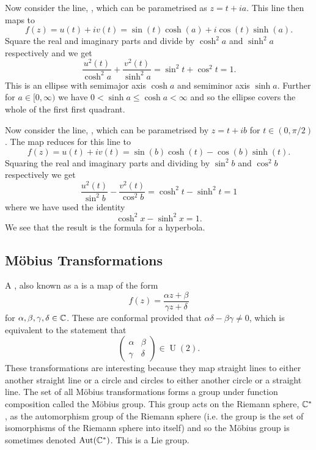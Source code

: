 \documentclass{article}
\begin{document}
    Now consider the line, , which can be parametrised as \(z = t + ia\).
    This line then maps to
    \[f(z) = u(t) + iv(t) = \sin(t)\cosh(a) + i \cos(t)\sinh(a).\]
    Square the real and imaginary parts and divide by \(\cosh^2 a\) and \(\sinh^2 a\) respectively and we get
    \[\frac{u^2(t)}{\cosh^2 a} + \frac{v^2(t)}{\sinh^2 a} = \sin^2 t + \cos^2 t = 1.\]
    This is an ellipse with semimajor axis \(\cosh a\) and semiminor axis \(\sinh a\).
    Further for \(a \in [0, \infty)\) we have \(0 < \sinh a \le \cosh a < \infty\) and so the ellipse covers the whole of the first first quadrant.
    
    Now consider the line, , which can be parametrised by \(z = t + ib\) for \(t \in (0, \pi/2)\).
    The map reduces for this line to
    \[f(z) = u(t) + iv(t) = \sin(b)\cosh(t) - \cos(b)\sinh(t).\]
    Squaring the real and imaginary parts and dividing by \(\sin^2 b\) and \(\cos^2 b\) respectively we get
    \[\frac{u^2(t)}{\sin^2 b} - \frac{v^2(t)}{\cos^2 b} = \cosh^2t - \sinh^2 t = 1\]
    where we have used the identity
    \[\cosh^2 x - \sinh^2 x = 1.\]
    We see that the result is the formula for a hyperbola.
    
    \subsection{M\"obius Transformations}
    A , also known as a  is a map of the form
    \[f(z) = \frac{\alpha z + \beta}{\gamma z + \delta}\]
    for \(\alpha, \beta, \gamma, \delta \in \mathbb{C}\).
    These are conformal provided that \(\alpha\delta - \beta\gamma \ne 0\), which is equivalent to the statement that
    \[
        \begin{pmatrix}
            \alpha & \beta\\
            \gamma & \delta
        \end{pmatrix}
        \in \mathop{\mathrm{U}}(2).
    \]
    These transformations are interesting because they map straight lines to either another straight line or a circle and circles to either another circle or a straight line.
    The set of all M\"obius transformations forms a group under function composition called the M\"obius group.
    This group acts on the Riemann sphere, \(\mathbb{C}^*\), as the automorphism group of the Riemann sphere (i.e. the group is the set of isomorphisms of the Riemann sphere into itself) and so the M\"obius group is sometimes denoted \(\mathop{\mathrm{Aut}}(\mathbb{C}^*)\).
    This is a Lie group.
    
\end{document}
